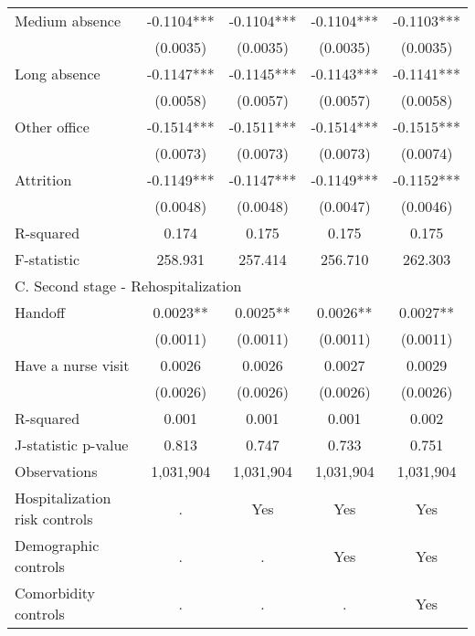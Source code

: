\documentclass[final,12pt, notitlepage]{article}
\begin{document}
\begin{singlespace}
\begin{table}[H]
\begin{threeparttable}
{\begin{tabular*}{\textwidth}{l@{\extracolsep{\fill}}*{4}{c}}
Medium absence      &     -0.1104***&     -0.1104***&     -0.1104***&     -0.1103***\\
                    &    (0.0035)   &    (0.0035)   &    (0.0035)   &    (0.0035)   \\
Long absence        &     -0.1147***&     -0.1145***&     -0.1143***&     -0.1141***\\
                    &    (0.0058)   &    (0.0057)   &    (0.0057)   &    (0.0058)   \\
Other office        &     -0.1514***&     -0.1511***&     -0.1514***&     -0.1515***\\
                    &    (0.0073)   &    (0.0073)   &    (0.0073)   &    (0.0074)   \\
Attrition           &     -0.1149***&     -0.1147***&     -0.1149***&     -0.1152***\\
                    &    (0.0048)   &    (0.0048)   &    (0.0047)   &    (0.0046)   \\
R-squared           &       0.174   &       0.175   &       0.175   &       0.175   \\
F-statistic         &     258.931   &     257.414   &     256.710   &     262.303   \\
\multicolumn{5}{l}{C. Second stage - Rehospitalization} \\
Handoff             &      0.0023** &      0.0025** &      0.0026** &      0.0027** \\
                    &    (0.0011)   &    (0.0011)   &    (0.0011)   &    (0.0011)   \\
Have a nurse visit  &      0.0026   &      0.0026   &      0.0027   &      0.0029   \\
                    &    (0.0026)   &    (0.0026)   &    (0.0026)   &    (0.0026)   \\
R-squared           &       0.001   &       0.001   &       0.001   &       0.002   \\
J-statistic p-value &       0.813   &       0.747   &       0.733   &       0.751   \\
\midrule
Observations        &     1,031,904   &     1,031,904   &     1,031,904   &     1,031,904   \\
Hospitalization risk controls & . & Yes & Yes & Yes \\
Demographic controls & . & . & Yes & Yes \\
 Comorbidity controls & . & . & . & Yes \\
\bottomrule
\end{tabular*}
}
\end{threeparttable}
\end{table}
\end{singlespace}
\end{document}
